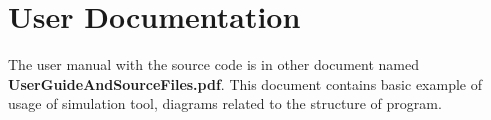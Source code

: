 \documentclass{report}
\begin{document}
\section{User Documentation}

The user manual with the source code is in other document named \textbf{UserGuideAndSourceFiles.pdf}. This document contains basic example of usage of simulation tool, diagrams related to the structure of program.





\end{document}
